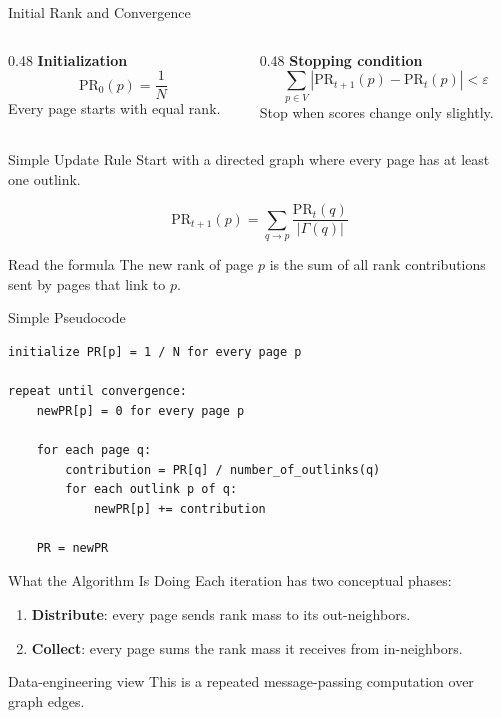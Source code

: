 \documentclass[aspectratio=169,11pt]{beamer}
\newcommand{\PR}{\mathrm{PR}}
\begin{document}
\begin{frame}{Initial Rank and Convergence}
\begin{columns}[T,onlytextwidth]
\begin{column}{0.48\textwidth}
\textbf{Initialization}
\[
\PR_0(p)=\frac{1}{N}
\]
Every page starts with equal rank.
\end{column}
\begin{column}{0.48\textwidth}
\textbf{Stopping condition}
\[
\sum_{p \in V} |\PR_{t+1}(p)-\PR_t(p)| < \varepsilon
\]
Stop when scores change only slightly.
\end{column}
\end{columns}
\end{frame}

\begin{frame}{Simple Update Rule}
Start with a directed graph where every page has at least one outlink.

\[
\PR_{t+1}(p)
=
\sum_{q \rightarrow p}
\frac{\PR_t(q)}{|\Gamma(q)|}
\]

\begin{block}{Read the formula}
The new rank of page \(p\) is the sum of all rank contributions sent by pages
that link to \(p\).
\end{block}
\end{frame}

\begin{frame}[fragile]{Simple Pseudocode}
\begin{verbatim}
initialize PR[p] = 1 / N for every page p

repeat until convergence:
    newPR[p] = 0 for every page p

    for each page q:
        contribution = PR[q] / number_of_outlinks(q)
        for each outlink p of q:
            newPR[p] += contribution

    PR = newPR
\end{verbatim}
\end{frame}

\begin{frame}{What the Algorithm Is Doing}
Each iteration has two conceptual phases:
\begin{enumerate}
  \item \textbf{Distribute}: every page sends rank mass to its out-neighbors.
  \item \textbf{Collect}: every page sums the rank mass it receives from in-neighbors.
\end{enumerate}

\begin{block}{Data-engineering view}
This is a repeated message-passing computation over graph edges.
\end{block}
\end{frame}
\end{document}
